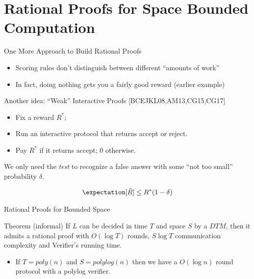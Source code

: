 \section{Rational Proofs for Space Bounded Computation}

\begin{frame}{One More Approach to Build Rational Proofs} %
	\begin{itemize}[<+- | alert@+>]
		\item Scoring rules don't distinguish between different ``amounts of work''
		\item In fact, doing nothing gets you a fairly good reward (earlier example)
	\end{itemize}
	\onslide<+->
	\begin{block}{Another idea: ``Weak'' Interactive Proofs [BCEJKL08,AM13,CG15,CG17]}
		\begin{itemize}[<+- | alert@+>]
			\item Fix a reward $R^*$;
			\item Run an interactive protocol that returns \textsf{accept} or \textsf{reject}.
			\item Pay $R^*$ if it returns \textsf{accept}; $0$ otherwise.
		\end{itemize}
	\end{block}
	\onslide<+->
	We only need the \textit{test} to recognize a false answer with some ``not too small'' probability $\delta$.
	\onslide<+->
	
	\[
		 \expectation[\tilde{R}] \leq R^*(1-\delta)
	\]
	
\end{frame}

\begin{frame}{Rational Proofs for Bounded Space}
	\begin{block}{Theorem (informal)}
		If $L$ can be decided in time $T$ and space $S$ by a $DTM$, then it admits a rational proof with $O(\log T)$ rounds, $S \log T$ communication complexity and Verifier's running time.
	\end{block}
	\begin{itemize}[<+->]
		\item If $T=poly(n)$ and $S=polylog(n)$ then we have a $O(\log n)$ round protocol with a polylog verifier.		
	\end{itemize}
\end{frame}


